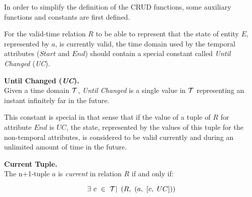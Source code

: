 



In order to simplify the definition of the CRUD functions, some auxiliary functions and constants are first defined.

For the valid-time relation $R$ to be able to represent that the state of entity $E$, represented by $a$, is currently valid, the time domain used by the temporal attributes ($Start$ and $End$) should contain a special constant called \emph{Until Changed} (\emph{UC}).

\begin{definition}
 \label{def:until-changed}
\textbf{Until Changed (\emph{UC}).}\\
Given a time domain $\mathcal{T}$, \emph{Until Changed} is a single value in $\mathcal{T}$ representing an instant infinitely far in the future.
\end{definition}
\vspace{10pt}

This constant is special in that sense that if the value of a tuple of $R$ for attribute $End$ is $UC$, the state, represented by the values of this tuple for the non-temporal attributes, is considered to be valid currently and during an unlimited amount of time in the future.



\begin{definition}
\label{def:current-tuple}
\textbf{Current Tuple.}\\
The n+1-tuple $a$ is \emph{current} in relation $R$ if and only if:

\begin{equation}
\exists\ c\ \in\ \T|\ \left(R,\ \left(a,\ \left[c,\ UC\right]\right)\right) \nonumber
\end{equation} 

\end{definition}

